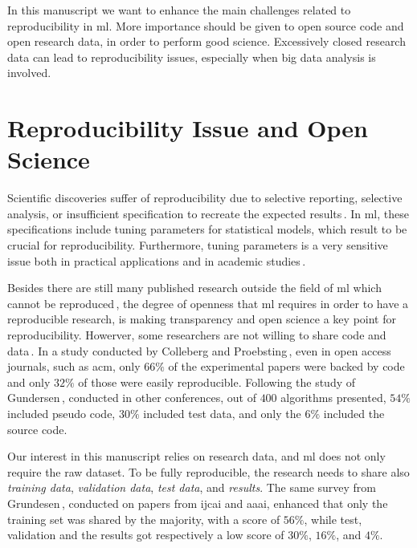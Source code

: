 In this manuscript we want to enhance the main challenges related to reproducibility
in \ac{ml}. More importance should be given to open source
code and open research data, in order to perform good science.
Excessively closed research data can lead to reproducibility issues,
especially when big data analysis is involved.

\section{Reproducibility Issue and Open Science}
Scientific discoveries suffer of reproducibility due
to selective reporting, selective analysis, or insufficient specification to recreate the
expected results\,\cite{aarts2016reproducibility}. 
In \ac{ml}, these specifications include tuning parameters for statistical models, 
which result to be crucial for reproducibility. Furthermore, tuning parameters
is a very sensitive issue both in practical applications and in academic studies\,\cite{birattari2004problem}.

Besides there are still many published research outside the field of \ac{ml} which cannot be
reproduced\,\cite{begley2012drug, begley2015reproducibility, prinz2011believe},
the degree of openness that \ac{ml} requires in order to have a reproducible research, is making
transparency and open science a key point for reproducibility.
Howerver, some researchers are not willing to share code and data\,\cite{gundersen2018state}.
In a study conducted by Colleberg and Proebsting\,\cite{Collberg:2016:RCS:2897191.2812803},
even in open access journals, such as \ac{acm}, only $66\%$ of the experimental papers
were backed by code and only $32\%$ of those were easily reproducible.
Following the study of Gundersen\,\cite{gundersen2018state},
conducted in other conferences, out of $400$ algorithms presented,
$54\%$ included pseudo code, $30\%$ included test data, and only the $6\%$
included the source code.

Our interest in this manuscript relies on research data, and \ac{ml} does not only require the raw dataset.
To be fully reproducible, the research needs to share also \emph{training data}, \emph{validation data},
\emph{test data}, and \emph{results}. The same survey from
Grundesen\,\cite{gundersen2018state}, conducted on papers from \ac{ijcai} and \ac{aaai}, enhanced that
only the training set was shared by the majority, with a score of $56\%$, while test, validation and the results
got respectively a low score of $30\%$, $16\%$, and $4\%$.

